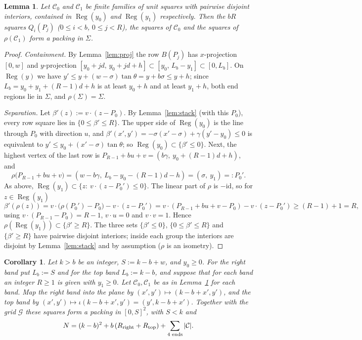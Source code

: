 \documentclass[11pt]{amsart}
\newcommand{\cG}{\mathcal G}
\newcommand{\cC}{\mathcal C}
\newcommand{\Reg}{\operatorname{Reg}}
\newtheorem{lemma}[theorem]{Lemma}
\newtheorem{corollary}[theorem]{Corollary}
\theoremstyle{definition}
\theoremstyle{remark}
\numberwithin{equation}{section}
\begin{document}
\begin{lemma}\label{lem:ends}
Let $\cC_0$ and $\cC_1$ be finite families of unit squares with pairwise disjoint interiors, contained in $\Reg(y_0)$ and
$\Reg(y_1)$ respectively. Then the $bR$ squares $Q_i(P_j)$ ($0\le i<b$, $0\le j<R$), the squares of $\cC_0$ and the
squares of $\rho(\cC_1)$ form a packing in $\Sigma$.
\end{lemma}

\begin{proof}
\emph{Containment.} By Lemma~\ref{lem:proj} the row $B(P_j)$ has $x$-projection $[0,w]$ and $y$-projection
$[y_0+jd,\,y_0+jd+h]\subset[y_0,\,L_b-y_1]\subset[0,L_b]$. On $\Reg(y)$ we have
$y'\le y+(w-\sigma)\tan\theta=y+b\sigma\le y+h$; since $L_b=y_0+y_1+(R-1)d+h$ is at least $y_0+h$ and at least
$y_1+h$, both end regions lie in $\Sigma$, and $\rho(\Sigma)=\Sigma$.

\emph{Separation.} Let $\beta'(z):=v\cdot(z-P_0)$. By Lemma~\ref{lem:stack} (with this $P_0$), every row square lies in
$\{0\le\beta'\le R\}$. The upper side of $\Reg(y_0)$ is the line through $P_0$ with direction $u$, and
$\beta'(x',y')=-\sigma(x'-\sigma)+\gamma(y'-y_0)\le0$ is equivalent to $y'\le y_0+(x'-\sigma)\tan\theta$; so
$\Reg(y_0)\subset\{\beta'\le0\}$. Next, the highest vertex of the last row is
$P_{R-1}+bu+v=(b\gamma,\ y_0+(R-1)d+h)$, and
\begin{equation}\label{eq:rot}
\rho\bigl(P_{R-1}+bu+v\bigr)=(w-b\gamma,\ L_b-y_0-(R-1)d-h)=(\sigma,\ y_1)=:P_0'.
\end{equation}
As above, $\Reg(y_1)\subset\{z:\ v\cdot(z-P_0')\le0\}$. The linear part of $\rho$ is $-\mathrm{id}$, so for
$z\in\Reg(y_1)$
\[
\beta'(\rho(z))=v\cdot\bigl(\rho(P_0')-P_0\bigr)-v\cdot(z-P_0')=v\cdot(P_{R-1}+bu+v-P_0)-v\cdot(z-P_0')\ge(R-1)+1=R,
\]
using $v\cdot(P_{R-1}-P_0)=R-1$, $v\cdot u=0$ and $v\cdot v=1$. Hence $\rho(\Reg(y_1))\subset\{\beta'\ge R\}$. The three
sets $\{\beta'\le0\}$, $\{0\le\beta'\le R\}$ and $\{\beta'\ge R\}$ have pairwise disjoint interiors; inside each group the
interiors are disjoint by Lemma~\ref{lem:stack} and by assumption ($\rho$ is an isometry).
\end{proof}

\begin{corollary}\label{cor:assembly}
Let $k>b$ be an integer, $S:=k-b+w$, and $y_0\ge0$. For the right band put $L_b:=S$ and for the top band $L_b:=k-b$, and
suppose that for each band an integer $R\ge1$ is given with $y_1\ge0$. Let $\cC_0,\cC_1$ be as in Lemma~\ref{lem:ends}
for each band. Map the right band into the plane by $(x',y')\mapsto(k-b+x',y')$, and the top band by
$(x',y')\mapsto\iota(k-b+x',y')=(y',k-b+x')$. Together with the grid $\cG$ these squares form a packing in $[0,S]^2$, with
$S<k$ and
\[
N=(k-b)^2+b\,(R_{\rm right}+R_{\rm top})+\sum_{\text{4 ends}}|\cC| .
\]
\end{corollary}
\end{document}
